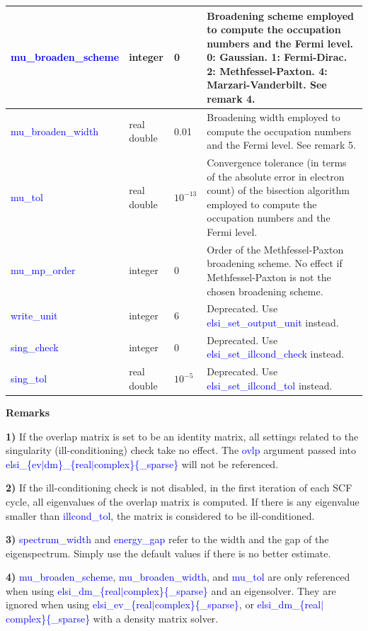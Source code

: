 \documentclass{report}
\newcommand{\tcb}[1]{\textcolor{blue}{#1}}
\begin{document}
\begin{tabular}[]{|p{30mm}|p{20mm}|p{15mm}|p{100mm}|}
\hline
\tcb{mu\_broaden\_scheme} & integer     & 0           & Broadening scheme employed to compute the occupation numbers and the Fermi level. 0: Gaussian. 1: Fermi-Dirac. 2: Methfessel-Paxton. 4: Marzari-Vanderbilt. See remark 4.\\
\hline
\tcb{mu\_broaden\_width}  & real double & 0.01        & Broadening width employed to compute the occupation numbers and the Fermi level. See remark 5.\\
\hline
\tcb{mu\_tol}             & real double & $10^{-13}$  & Convergence tolerance (in terms of the absolute error in electron count) of the bisection algorithm employed to compute the occupation numbers and the Fermi level.\\
\hline
\tcb{mu\_mp\_order}       & integer     & 0           & Order of the Methfessel-Paxton broadening scheme. No effect if Methfessel-Paxton is not the chosen broadening scheme.\\
\hline
\tcb{write\_unit}         & integer     & 6           & Deprecated. Use \tcb{elsi\_set\_output\_unit} instead.\\
\hline
\tcb{sing\_check}         & integer     & 0           & Deprecated. Use \tcb{elsi\_set\_illcond\_check} instead.\\
\hline
\tcb{sing\_tol}           & real double & $10^{-5}$   & Deprecated. Use \tcb{elsi\_set\_illcond\_tol} instead.\\
\hline
\end{tabular}

\textbf{Remarks}

\textbf{1)} If the overlap matrix is set to be an identity matrix, all settings related to the singularity (ill-conditioning) check take no effect. The \tcb{ovlp} argument passed into \tcb{elsi\_\{ev$\vert$dm\}\_\{real$\vert$complex\}\{\_sparse\}} will not be referenced.

\textbf{2)} If the ill-conditioning check is not disabled, in the first iteration of each SCF cycle, all eigenvalues of the overlap matrix is computed. If there is any eigenvalue smaller than \tcb{illcond\_tol}, the matrix is considered to be ill-conditioned.

\textbf{3)} \tcb{spectrum\_width} and \tcb{energy\_gap} refer to the width and the gap of the eigenspectrum. Simply use the default values if there is no better estimate.

\textbf{4)} \tcb{mu\_broaden\_scheme}, \tcb{mu\_broaden\_width}, and  \tcb{mu\_tol} are only referenced when using \tcb{elsi\_dm\_\{real$\vert$complex\}\{\_sparse\}} and an eigensolver. They are ignored when using \tcb{elsi\_ev\_\{real$\vert$complex\}\{\_sparse\}}, or \tcb{elsi\_dm\_\{real$\vert$complex\}\{\_sparse\}} with a density matrix solver.
\end{document}
